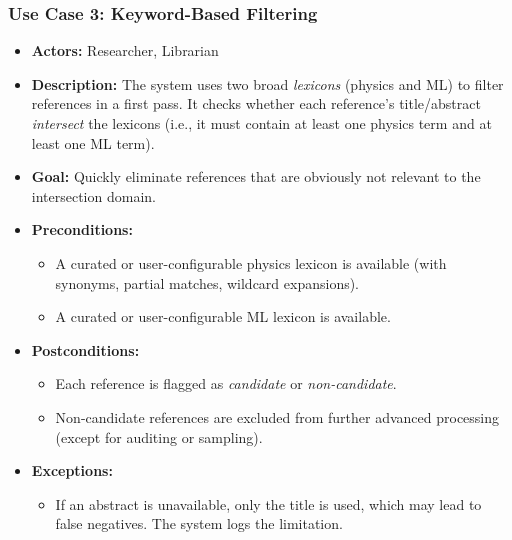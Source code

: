 \documentclass[12pt]{article}
\begin{document}
\subsubsection{Use Case 3: Keyword-Based Filtering}
\begin{itemize}
  \item \textbf{Actors:} Researcher, Librarian
  \item \textbf{Description:} The system uses two broad \emph{lexicons} (physics and ML) to filter references in a first pass. It checks whether each reference’s title/abstract \emph{intersect} the lexicons (i.e., it must contain at least one physics term and at least one ML term).
  \item \textbf{Goal:} Quickly eliminate references that are obviously not relevant to the intersection domain. 
  \item \textbf{Preconditions:} 
    \begin{itemize}
      \item A curated or user-configurable physics lexicon is available (with synonyms, partial matches, wildcard expansions).
      \item A curated or user-configurable ML lexicon is available.
    \end{itemize}
  \item \textbf{Postconditions:}
    \begin{itemize}
      \item Each reference is flagged as \emph{candidate} or \emph{non-candidate}.
      \item Non-candidate references are excluded from further advanced processing (except for auditing or sampling).
    \end{itemize}
  \item \textbf{Exceptions:}
    \begin{itemize}
      \item If an abstract is unavailable, only the title is used, which may lead to false negatives. The system logs the limitation.
    \end{itemize}
\end{itemize}
\end{document}
